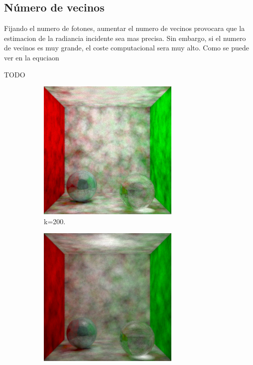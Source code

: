 \documentclass{article}
\begin{document}
\subsection{Número de vecinos}
Fijando el numero de fotones, aumentar el numero de vecinos provocara que la estimacion de la radiancia incidente sea mas precisa. Sin embargo, si el numero de vecinos es muy grande, el coste computacional sera muy alto. Como se puede ver en la equciaon

TODO

\begin{figure}
\begin{subfigure}[h]{0.32\linewidth}
\includegraphics[width=\linewidth]{imgs/100k200k.png}
\caption{k=200.}
\end{subfigure}
\hfill
\begin{subfigure}[h]{0.32\linewidth}
\includegraphics[width=\linewidth]{imgs/100k1000k.png}

\end{subfigure}
\end{figure}
\end{document}
